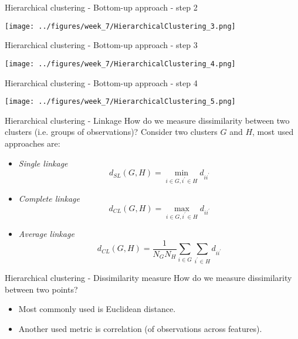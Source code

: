 \documentclass[notes]{beamer}          %
\begin{document}
\begin{frame}{Hierarchical clustering - Bottom-up approach - step 2}
\begin{center}
\texttt{[image: ../figures/week\_7/HierarchicalClustering\_3.png]}  
\end{center}
\end{frame}

\begin{frame}{Hierarchical clustering - Bottom-up approach - step 3}
\begin{center}
\texttt{[image: ../figures/week\_7/HierarchicalClustering\_4.png]}  
\end{center}
\end{frame}

\begin{frame}{Hierarchical clustering - Bottom-up approach - step 4}
\begin{center}
\texttt{[image: ../figures/week\_7/HierarchicalClustering\_5.png]}  
\end{center}
\end{frame}

\begin{frame}{Hierarchical clustering - Linkage}
How do we measure dissimilarity between two clusters (i.e. groups of observations)?
Consider two clusters $G$ and $H$, most used approaches are: 
\begin{itemize}
\item \textit{Single linkage}
\begin{equation*}
	d_{SL}(G, H) = \min_{i \in G, i^\prime \in H} d_{ii^\prime}
\end{equation*}
\item \textit{Complete linkage}
\begin{equation*}
	d_{CL}(G, H) = \max_{i \in G, i^\prime \in H} d_{ii^\prime}
\end{equation*}
\item \textit{Average linkage}
\begin{equation*}
	d_{CL}(G, H) = \frac{1}{N_G N_H} \sum_{i \in G} \sum_{i^\prime \in H}  d_{ii^\prime}
\end{equation*}
\end{itemize}
\end{frame}

\begin{frame}{Hierarchical clustering - Dissimilarity measure}
How do we measure dissimilarity between two points?
\begin{itemize}
\item  Most commonly used is Euclidean distance.
\item Another used metric is correlation (of observations across features).
\end{itemize}
\end{frame}
\end{document}
